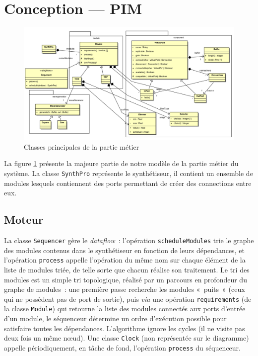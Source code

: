 \section{Conception — PIM}

\begin{figure}[p]
\centering
\includegraphics[width=21cm,angle=90]{../img/ps/business-pim-light.pdf}
\caption{Classes principales de la partie métier}
\label{pim-class}
\end{figure}

La figure \ref{pim-class} présente la majeure partie de notre modèle de la partie
métier du système. La classe \verb!SynthPro! représente le
synthétiseur, il contient un ensemble de modules lesquels
contiennent des ports permettant de créer des connections entre
eux.

\subsection{Moteur}

La classe \verb!Sequencer! gère le \emph{dataflow}~: l'opération
\verb!scheduleModules! trie le graphe des modules contenus dans le
synthétiseur en fonction de leurs dépendances, et l'opération
\verb!process! appelle l'opération du même nom sur chaque élément
de la liste de modules triée, de telle sorte que chacun réalise son
traitement. Le tri des modules est un simple tri topologique,
réalisé par un parcours en profondeur du graphe de modules~: une
première passe recherche les modules «~puits~» (ceux qui ne
possèdent pas de port de sortie), puis \emph{via} une opération
\verb!requirements! (de la classe \verb!Module!) qui retourne la
liste des modules connectés aux ports d'entrée d'un module, le
séquenceur détermine un ordre d'exécution possible pour satisfaire
toutes les dépendances. L'algorithme ignore les cycles (il ne
visite pas deux fois un même nœud).
Une classe \texttt{Clock} (non représentée sur le diagramme) appelle périodiquement,
en tâche de fond, l’opération \texttt{process} du séquenceur.

